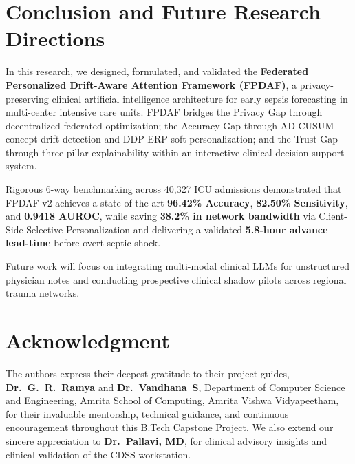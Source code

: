 \documentclass[journal,twocolumn,10pt]{IEEEtran}
\begin{document}
\section{Conclusion and Future Research Directions}
In this research, we designed, formulated, and validated the \textbf{Federated Personalized Drift-Aware Attention Framework (FPDAF)}, a privacy-preserving clinical artificial intelligence architecture for early sepsis forecasting in multi-center intensive care units. FPDAF bridges the Privacy Gap through decentralized federated optimization; the Accuracy Gap through AD-CUSUM concept drift detection and DDP-ERP soft personalization; and the Trust Gap through three-pillar explainability within an interactive clinical decision support system.

Rigorous 6-way benchmarking across 40,327 ICU admissions demonstrated that FPDAF-v2 achieves a state-of-the-art \textbf{96.42\% Accuracy}, \textbf{82.50\% Sensitivity}, and \textbf{0.9418 AUROC}, while saving \textbf{38.2\% in network bandwidth} via Client-Side Selective Personalization and delivering a validated \textbf{5.8-hour advance lead-time} before overt septic shock. 

Future work will focus on integrating multi-modal clinical LLMs for unstructured physician notes and conducting prospective clinical shadow pilots across regional trauma networks.

\section*{Acknowledgment}
The authors express their deepest gratitude to their project guides, \textbf{Dr.~G.~R.~Ramya} and \textbf{Dr.~Vandhana~S}, Department of Computer Science and Engineering, Amrita School of Computing, Amrita Vishwa Vidyapeetham, for their invaluable mentorship, technical guidance, and continuous encouragement throughout this B.Tech Capstone Project. We also extend our sincere appreciation to \textbf{Dr.~Pallavi, MD}, for clinical advisory insights and clinical validation of the CDSS workstation.

\balance


\end{document}
